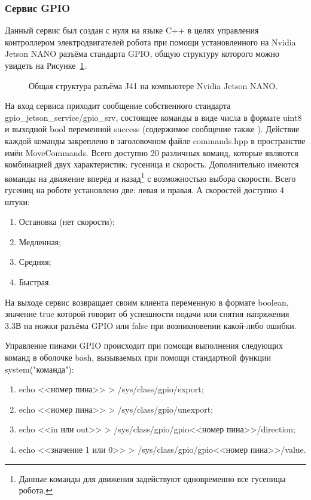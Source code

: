 \subsubsection{Сервис GPIO}
Данный сервис был создан с нуля на языке C++ в целях управления контроллером электродвигателей робота при помощи установленного на Nvidia Jetson NANO разъёма стандарта GPIO, общую структуру которого можно увидеть на Рисунке~\ref{fig:jetson-gpio}.

\begin{figure}[ht]
  \caption{Общая структура разъёма J41 на компьютере Nvidia Jetson NANO.}\label{fig:jetson-gpio}
\end{figure}

На вход сервиса приходит сообщение собственного стандарта gpio\_jetson\_service/gpio\_srv, состоящее команды в виде числа в формате uint8 и выходной bool переменной success (содержимое сообщение также ). Действие каждой команды закреплено в заголовочном файле commands.hpp в пространстве имён MoveCommands. Всего доступно 20 различных команд, которые являются комбинацией двух характеристик: гусеница и скорость. Дополнительно имеются команды на движение вперёд и назад\footnote{Данные команды для движения задействуют одновременно все гусеницы робота.} с возможностью выбора скорости. Всего гусениц на роботе установлено две: левая и правая. А скоростей доступно 4 штуки:

\begin{enumerate}
\item Остановка (нет скорости);
\item Медленная;
\item Средняя;
\item Быстрая.
\end{enumerate}

На выходе сервис возвращает своим клиента переменную в формате boolean, значение true которой говорит об успешности подачи или снятия напряжения 3.3В на ножки разъёма GPIO или false при возникновении какой-либо ошибки.

Управление пинами GPIO происходит при помощи выполнения следующих команд в оболочке bash, вызываемых при помощи стандартной функции system("команда"):
\begin{enumerate}
\item echo <<номер пина>> > /sys/class/gpio/export;
\item echo <<номер пина>> > /sys/class/gpio/unexport;
\item echo <<in или out>> > /sys/class/gpio/gpio<<номер пина>>/direction;
\item echo <<значение 1 или 0>> > /sys/class/gpio/gpio<<номер пина>>/value.
\end{enumerate} 

